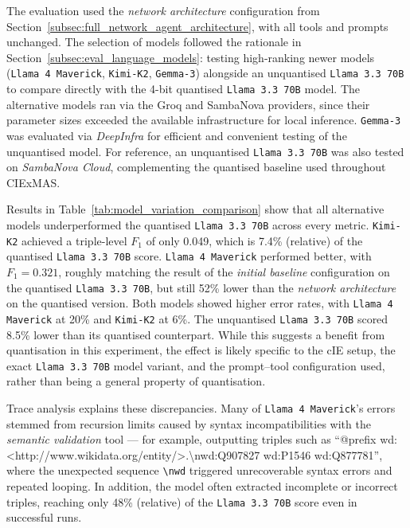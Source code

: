 \documentclass[a4paper,oneside,bibliography=totoc]{scrbook}
\begin{document}
The evaluation used the \textit{network architecture} configuration from Section~\ref{subsec:full_network_agent_architecture}, with all tools and prompts unchanged. The selection of models followed the rationale in Section~\ref{subsec:eval_language_models}: testing high-ranking newer models (\texttt{Llama 4 Maverick}, \texttt{Kimi-K2}, \texttt{Gemma-3}) alongside an unquantised \texttt{Llama 3.3 70B} to compare directly with the 4-bit quantised \texttt{Llama 3.3 70B} model. The alternative models ran via the Groq and SambaNova providers, since their parameter sizes exceeded the available infrastructure for local inference. \texttt{Gemma-3} was evaluated via \textit{DeepInfra} for efficient and convenient testing of the unquantised model. For reference, an unquantised \texttt{Llama 3.3 70B} was also tested on \textit{SambaNova Cloud}, complementing the quantised baseline used throughout CIExMAS.

Results in Table~\ref{tab:model_variation_comparison} show that all alternative models underperformed the quantised \texttt{Llama 3.3 70B} across every metric. \texttt{Kimi-K2} achieved a triple-level $F_{1}$ of only 0.049, which is 7.4\% (relative) of the quantised \texttt{Llama 3.3 70B} score. \texttt{Llama 4 Maverick} performed better, with $F_{1}=0.321$, roughly matching the result of the \textit{initial baseline} configuration on the quantised \texttt{Llama 3.3 70B}, but still 52\% lower than the \textit{network architecture} on the quantised version. Both models showed higher error rates, with \texttt{Llama 4 Maverick} at 20\% and \texttt{Kimi-K2} at 6\%. The unquantised \texttt{Llama 3.3 70B} scored 8.5\% lower than its quantised counterpart. While this suggests a benefit from quantisation in this experiment, the effect is likely specific to the \ac{cIE} setup, the exact \texttt{Llama 3.3 70B} model variant, and the prompt–tool configuration used, rather than being a general property of quantisation.

Trace analysis explains these discrepancies. Many of \texttt{Llama 4 Maverick}’s errors stemmed from recursion limits caused by syntax incompatibilities with the \textit{semantic validation} tool — for example, outputting triples such as
\enquote{@prefix wd: \textless http://www.wikidata.org/entity/\textgreater.\textbackslash nwd:Q907827 wd:P1546 wd:Q877781},
where the unexpected sequence \verb|\nwd| triggered unrecoverable syntax errors and repeated looping. In addition, the model often extracted incomplete or incorrect triples, reaching only 48\% (relative) of the \texttt{Llama 3.3 70B} score even in successful runs.
\end{document}
